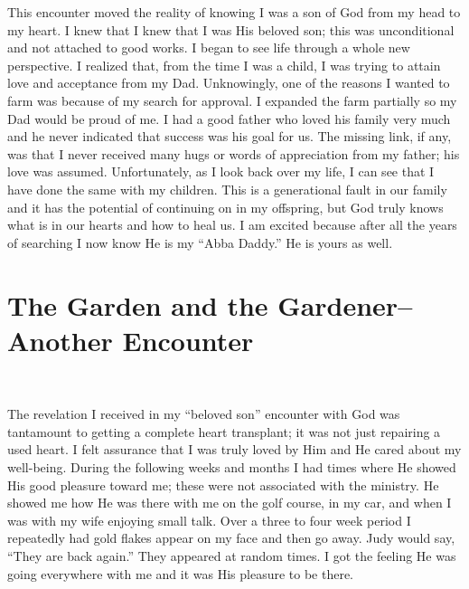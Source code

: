 \documentclass[oneside]{book}
\begin{document}
This encounter moved the reality of knowing I was a son of God from my head to my heart. I knew that I knew that I was His beloved son; this was unconditional and not attached to good works. I began to see life through a whole new perspective. I realized that, from the time I was a child, I was trying to attain love and acceptance from my Dad. Unknowingly, one of the reasons I wanted to farm was because of my search for approval. I expanded the farm partially so my Dad would be proud of me. I had a good father who loved his family very much and he never indicated that success was his goal for us. The missing link, if any, was that I never received many hugs or words of appreciation from my father; his love was assumed. Unfortunately, as I look back over my life, I can see that I have done the same with my children. This is a generational fault in our family and it has the potential of continuing on in my offspring, but God truly knows what is in our hearts and how to heal us. I am excited because after all the years of searching I now know He is my  “Abba Daddy.” He is yours as well. 


\section{The Garden and the Gardener--Another Encounter}
\

The revelation I received in my “beloved son” encounter with God was tantamount to getting a complete heart transplant; it was not just repairing a used heart. I felt assurance that I was truly loved by Him and He cared about my well-being. During the following weeks and months I had times where He showed His good pleasure toward me; these were not associated with the ministry. He showed me how He was there with me on the golf course, in my car, and when I was with my wife enjoying small talk. Over a three to four week period I repeatedly had gold flakes appear on my face and then go away. Judy would say, “They are back again.” They appeared at random times. I got the feeling He was going everywhere with me and it was His pleasure to be there.
 
\end{document}

